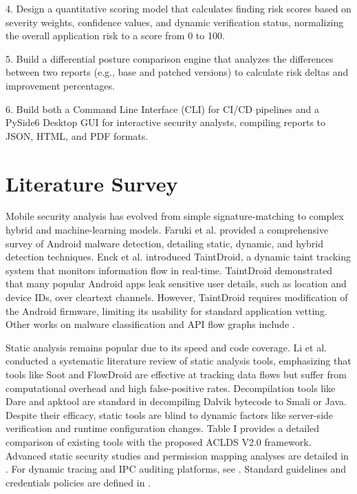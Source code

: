 \documentclass[conference]{
IEEEtran}
\begin{document}
4. Design a quantitative scoring model that calculates finding risk scores based on severity weights, confidence values, and dynamic verification status, normalizing the overall application risk to a score from 0 to 100.

5. Build a differential posture comparison engine that analyzes the differences between two reports (e.g., base and patched versions) to calculate risk deltas and improvement percentages.

6. Build both a Command Line Interface (CLI) for CI/CD pipelines and a PySide6 Desktop GUI for interactive security analysts, compiling reports to JSON, HTML, and PDF formats.

\section{Literature Survey}
Mobile security analysis has evolved from simple signature-matching to complex hybrid and machine-learning models. Faruki et al. \cite{r1} provided a comprehensive survey of Android malware detection, detailing static, dynamic, and hybrid detection techniques. Enck et al. \cite{r2} introduced TaintDroid, a dynamic taint tracking system that monitors information flow in real-time. TaintDroid demonstrated that many popular Android apps leak sensitive user details, such as location and device IDs, over cleartext channels. However, TaintDroid requires modification of the Android firmware, limiting its usability for standard application vetting. Other works on malware classification and API flow graphs include \cite{r3, r9, r10, r11, r12, r17, r31, r32}.

Static analysis remains popular due to its speed and code coverage. Li et al. \cite{r6} conducted a systematic literature review of static analysis tools, emphasizing that tools like Soot and FlowDroid are effective at tracking data flows but suffer from computational overhead and high false-positive rates. Decompilation tools like Dare \cite{r7} and apktool are standard in decompiling Dalvik bytecode to Smali or Java. Despite their efficacy, static tools are blind to dynamic factors like server-side verification and runtime configuration changes. Table I provides a detailed comparison of existing tools with the proposed ACLDS V2.0 framework. Advanced static security studies and permission mapping analyses are detailed in \cite{r4, r5, r8, r19, r20, r26, r27, r29, r30, r35}. For dynamic tracing and IPC auditing platforms, see \cite{r15, r16, r18, r21, r28, r34}. Standard guidelines and credentials policies are defined in \cite{r13, r14, r22, r23, r24, r25, r33}.
\end{document}
